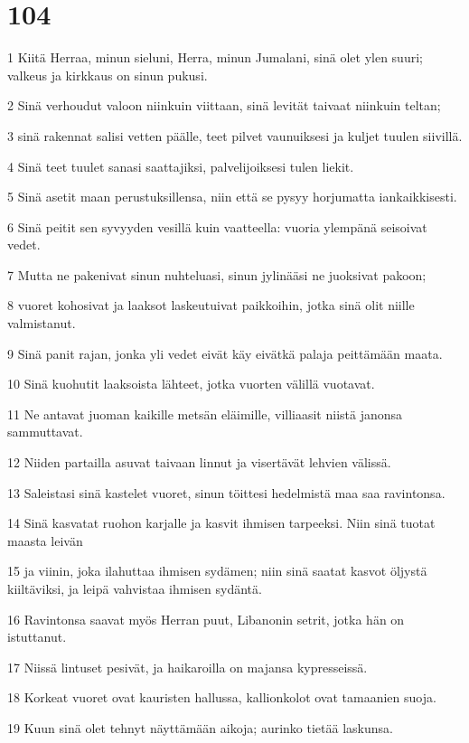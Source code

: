 \chapter{104}

\par 1 Kiitä Herraa, minun sieluni, Herra, minun Jumalani, sinä olet ylen suuri; valkeus ja kirkkaus on sinun pukusi.
\par 2 Sinä verhoudut valoon niinkuin viittaan, sinä levität taivaat niinkuin teltan;
\par 3 sinä rakennat salisi vetten päälle, teet pilvet vaunuiksesi ja kuljet tuulen siivillä.
\par 4 Sinä teet tuulet sanasi saattajiksi, palvelijoiksesi tulen liekit.
\par 5 Sinä asetit maan perustuksillensa, niin että se pysyy horjumatta iankaikkisesti.
\par 6 Sinä peitit sen syvyyden vesillä kuin vaatteella: vuoria ylempänä seisoivat vedet.
\par 7 Mutta ne pakenivat sinun nuhteluasi, sinun jylinääsi ne juoksivat pakoon;
\par 8 vuoret kohosivat ja laaksot laskeutuivat paikkoihin, jotka sinä olit niille valmistanut.
\par 9 Sinä panit rajan, jonka yli vedet eivät käy eivätkä palaja peittämään maata.
\par 10 Sinä kuohutit laaksoista lähteet, jotka vuorten välillä vuotavat.
\par 11 Ne antavat juoman kaikille metsän eläimille, villiaasit niistä janonsa sammuttavat.
\par 12 Niiden partailla asuvat taivaan linnut ja visertävät lehvien välissä.
\par 13 Saleistasi sinä kastelet vuoret, sinun töittesi hedelmistä maa saa ravintonsa.
\par 14 Sinä kasvatat ruohon karjalle ja kasvit ihmisen tarpeeksi. Niin sinä tuotat maasta leivän
\par 15 ja viinin, joka ilahuttaa ihmisen sydämen; niin sinä saatat kasvot öljystä kiiltäviksi, ja leipä vahvistaa ihmisen sydäntä.
\par 16 Ravintonsa saavat myös Herran puut, Libanonin setrit, jotka hän on istuttanut.
\par 17 Niissä lintuset pesivät, ja haikaroilla on majansa kypresseissä.
\par 18 Korkeat vuoret ovat kauristen hallussa, kallionkolot ovat tamaanien suoja.
\par 19 Kuun sinä olet tehnyt näyttämään aikoja; aurinko tietää laskunsa.
